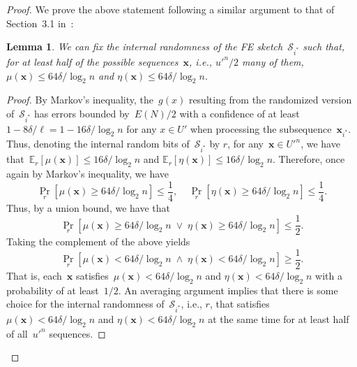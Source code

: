 \documentclass[sigconf]{acmart}
\newtheorem{lemma}[theorem]{Lemma}
\begin{document}
\begin{proof}
    We prove the above statement following a similar argument to that of
    Section~3.1 in~\cite{PaghExpandability}:
    \begin{lemma}
        \label{lemma:derandomization}
        We can fix the internal randomness of the FE sketch~$\mathcal{S}_{i^*}$
        such that, for at least half of the possible sequences~$\mathbf{x}$,
        i.e., ${u'}^n/2$ many of them, $\mu(\mathbf{x}) \leq 64\delta/\log_2 n$
        and $\eta(\mathbf{x}) \leq 64\delta/\log_2 n$.
    \end{lemma}
    \begin{proof}
        By Markov's inequality, the~$g(x)$ resulting from the randomized
        version of~$\mathcal{S}_{i^*}$ has errors bounded by~$E(N)/2$ with a
        confidence of at least~$1-8\delta/\ell=1-16\delta/\log_2 n$ for any $x
        \in U'$ when processing the subsequence~$\mathbf{x}_{i^*}$. Thus,
        denoting the internal random bits of~$\mathcal{S}_{i^*}$ by $r$, for
        any~$\mathbf{x} \in {U'}^n$, we have that~$\mathbb{E}_r\left[ 
        \mu(\mathbf{x}) \right] \leq 16\delta/\log_2 n$ and 
        $\mathbb{E}_r\left[ \eta(\mathbf{x}) \right] \leq 16\delta/\log_2 n$.
        Therefore, once again by Markov's inequality, we have
        $$ \Pr_r\left[ \mu(\mathbf{x}) \geq 64\delta/\log_2 n \right] \leq \frac{1}{4}, \;\;\;\; \Pr_r\left[ \eta(\mathbf{x}) \geq 64\delta/\log_2 n \right] \leq \frac{1}{4}. $$
        Thus, by a union bound, we have that 
        $$ \Pr_r\left[ \mu(\mathbf{x}) \geq 64\delta/\log_2 n \;\vee\; \eta(\mathbf{x}) \geq 64\delta/\log_2 n \right] \leq \frac{1}{2}. $$
        Taking the complement of the above yields 
        $$ \Pr_r\left[ \mu(\mathbf{x}) < 64\delta/\log_2 n \;\wedge\; \eta(\mathbf{x}) < 64\delta/\log_2 n \right] \geq \frac{1}{2}. $$
        That is, each~$\mathbf{x}$ satisfies~$\mu(\mathbf{x}) < 64\delta/\log_2
        n$ and $\eta(\mathbf{x}) < 64\delta/\log_2 n$ with a probability of at
        least~$1/2$. An averaging argument implies that there is some choice
        for the internal randomness of~$\mathcal{S}_{i^*}$, i.e., $r$, that
        satisfies~$\mu(\mathbf{x}) < 64\delta/\log_2 n$ and $\eta(\mathbf{x}) <
        64\delta/\log_2 n$ at the same time for at least half of all~${u'}^n$
        sequences.
    \end{proof}


\end{proof}
\end{document}
